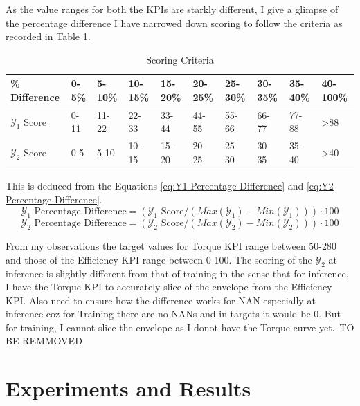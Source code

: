\documentclass{report} %
\begin{document}
As the value ranges for both the \ac{KPI}s are starkly different, I give a glimpse of the percentage difference
I have narrowed down scoring to follow the criteria as recorded in Table \ref{tab:Scoring Criteria}.
\begin{table}[H]
    \centering
    \begin{tabularx}{1\linewidth}{|X|X|X|X|X|X|X|X|X|X|}
    \hline {\bf \% Difference} & {\bf 0-5\%} & {\bf 5-10\%} & {\bf 10-15\%} & {\bf 15-20\%} & {\bf 20-25\%} & {\bf 25-30\%} & {\bf 30-35\%} & {\bf 35-40\%} & {\bf 40-100\%}\\
    \hline 
    $\mathcal{Y}_1$ Score& 0-11& 11-22 & 22-33 & 33-44 & 44-55& 55-66 & 66-77 & 77-88 & \textgreater 88\\
    $\mathcal{Y}_2$ Score& 0-5 & 5-10 & 10-15 & 15-20 & 20-25& 25-30 & 30-35 & 35-40 &\textgreater 40\\
    \hline
    \end{tabularx}
    \caption{Scoring Criteria}
    \label{tab:Scoring Criteria}
\end{table}

This is deduced from the Equations \ref{eq:Y1 Percentage Difference} and \ref{eq:Y2 Percentage Difference}.
\begin{equation}
    \text{$\mathcal{Y}_1$ Percentage Difference} = (\text{$\mathcal{Y}_1$ Score} / {(Max(\mathcal{Y}_1) - Min(\mathcal{Y}_1))})  \cdot 100
    \label{eq:Y1 Percentage Difference}
\end{equation}
\begin{equation}
    \text{$\mathcal{Y}_2$ Percentage Difference} = (\text{$\mathcal{Y}_2$ Score} / {(Max(\mathcal{Y}_2) - Min(\mathcal{Y}_2))})  \cdot 100
    \label{eq:Y2 Percentage Difference}
\end{equation}

From my observations the target values for Torque \ac{KPI} range between 50-280 and those of the Efficiency \ac{KPI} range between 0-100.
The scoring of the $\mathcal{Y}_2$ at inference is slightly different from that of training in the sense that for inference, I have the Torque \ac{KPI} to 
accurately slice of the envelope from the Efficiency \ac{KPI}. Also need to ensure how the difference works for NAN especially at inference coz 
for Training there are no NANs and in targets it would be 0. But for training, I cannot slice the envelope as I donot have the Torque curve yet.--TO BE REMMOVED

\chapter{Experiments and Results}
\end{document}
